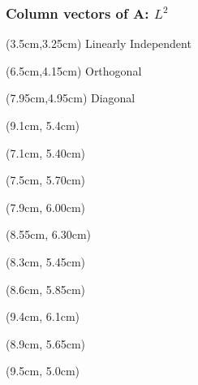 \documentclass[handout]{beamer}
\begin{document}
{
{
\begin{frame}      %
\frametitle{Column vectors of $\mathbf{A}$: $L^{2}$}
    \begin{textblock*}{5cm}(3.5cm,3.25cm)%
     Linearly Independent
  \end{textblock*}
  \begin{textblock*}{5cm}(6.5cm,4.15cm)%
     Orthogonal
  \end{textblock*}
  \begin{textblock*}{5cm}(7.95cm,4.95cm)%
     Diagonal
  \end{textblock*}
      {\tiny{
      \begin{textblock*}{5cm}(9.1cm, 5.4cm)%
      \end{textblock*}
      \begin{textblock*}{5cm}(7.1cm, 5.40cm)%
      \end{textblock*}
      \begin{textblock*}{5cm}(7.5cm, 5.70cm)%
      \end{textblock*}
      \begin{textblock*}{5cm}(7.9cm, 6.00cm)%
      \end{textblock*}
      \begin{textblock*}{5cm}(8.55cm, 6.30cm)%
      \end{textblock*}
      \begin{textblock*}{5cm}(8.3cm, 5.45cm)%
      \end{textblock*}
      \begin{textblock*}{5cm}(8.6cm, 5.85cm)%
      \end{textblock*}
      \begin{textblock*}{5cm}(9.4cm, 6.1cm)%
      \end{textblock*}
      \begin{textblock*}{5cm}(8.9cm, 5.65cm)%
      \end{textblock*}
      \begin{textblock*}{5cm}(9.5cm, 5.0cm)%
      \end{textblock*}
      }}
\end{frame}
}}
\end{document}
